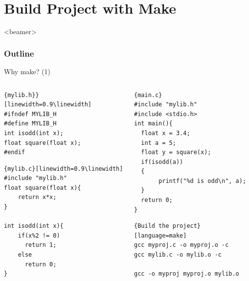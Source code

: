 \section{Build Project with Make}
\label{sec:make}
\begin{frame}<beamer>
    \frametitle{Outline}
    \tableofcontents[currentsection]
\end{frame}

\begin{frame}[fragile]{Why make? (1)}
\vspace{-0.3in}
\begin{columns}
\begin{column}{0.4\linewidth}
\begin{lstlisting}{mylib.h}}[linewidth=0.9\linewidth]
#ifndef MYLIB_H
#define MYLIB_H
int isodd(int x);
float square(float x);
#endif
\end{lstlisting}
\vspace{-0.1in}
\begin{lstlisting}{mylib.c}[linewidth=0.9\linewidth]
#include "mylib.h"
float square(float x){
    return x*x;
}

int isodd(int x){
    if(x%2 != 0)
      return 1;
    else
      return 0;
}
\end{lstlisting}
\end{column}
\begin{column}{0.54\linewidth}
\begin{lstlisting}{main.c}
#include "mylib.h"
#include <stdio.h>
int main(){
  float x = 3.4;
  int a = 5;
  float y = square(x);
  if(isodd(a))
  {
       printf("%d is odd\n", a);
  }
  return 0;
}
\end{lstlisting}
\vspace{-0.15in}
\begin{lstlisting}{Build the project}[language=make]
gcc myproj.c -o myproj.o -c
gcc mylib.c -o mylib.o -c

gcc -o myproj myproj.o mylib.o
\end{lstlisting}
\end{column}
\end{columns}
\end{frame}

